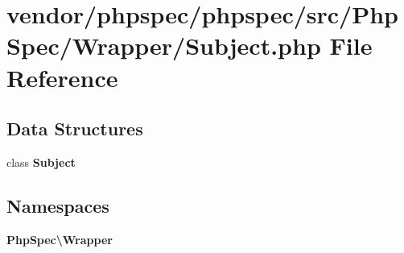 \section{vendor/phpspec/phpspec/src/\+Php\+Spec/\+Wrapper/\+Subject.php File Reference}
\label{_subject_8php}
\subsection*{Data Structures}
\begin{DoxyCompactItemize}
\item 
class {\bf Subject}
\end{DoxyCompactItemize}
\subsection*{Namespaces}
\begin{DoxyCompactItemize}
\item 
 {\bf Php\+Spec\textbackslash{}\+Wrapper}
\end{DoxyCompactItemize}
